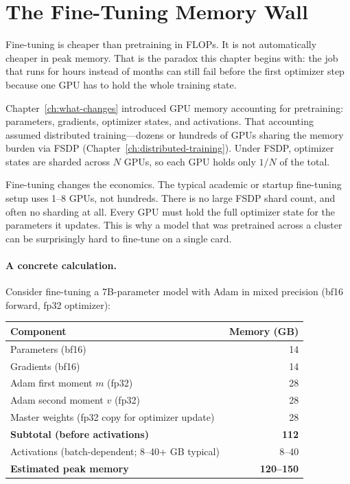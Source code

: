 \section{The Fine-Tuning Memory Wall}
\label{sec:memory-wall-peft}

Fine-tuning is cheaper than pretraining in FLOPs. It is not automatically cheaper in peak memory. That is the paradox this chapter begins with: the job that runs for hours instead of months can still fail before the first optimizer step because one GPU has to hold the whole training state.

Chapter~\ref{ch:what-changes} introduced GPU memory accounting for pretraining: parameters, gradients, optimizer states, and activations. That accounting assumed distributed training---dozens or hundreds of GPUs sharing the memory burden via FSDP (Chapter~\ref{ch:distributed-training}). Under FSDP, optimizer states are sharded across $N$ GPUs, so each GPU holds only $1/N$ of the total.

Fine-tuning changes the economics. The typical academic or startup fine-tuning setup uses 1--8 GPUs, not hundreds. There is no large FSDP shard count, and often no sharding at all. Every GPU must hold the full optimizer state for the parameters it updates. This is why a model that was pretrained across a cluster can be surprisingly hard to fine-tune on a single card.

\paragraph{A concrete calculation.} Consider fine-tuning a 7B-parameter model with Adam in mixed precision (bf16 forward, fp32 optimizer):

\begin{center}
\begin{tabularx}{\textwidth}{@{}Xr@{}}
\toprule
\textbf{Component} & \textbf{Memory (GB)} \\
\midrule
Parameters (bf16) & 14 \\
Gradients (bf16) & 14 \\
Adam first moment $m$ (fp32) & 28 \\
Adam second moment $v$ (fp32) & 28 \\
Master weights (fp32 copy for optimizer update) & 28 \\
\midrule
\textbf{Subtotal (before activations)} & \textbf{112} \\
Activations (batch-dependent; 8--40+ GB typical) & 8--40 \\
\midrule
\textbf{Estimated peak memory} & \textbf{120--150} \\
\bottomrule
\end{tabularx}
\end{center}

